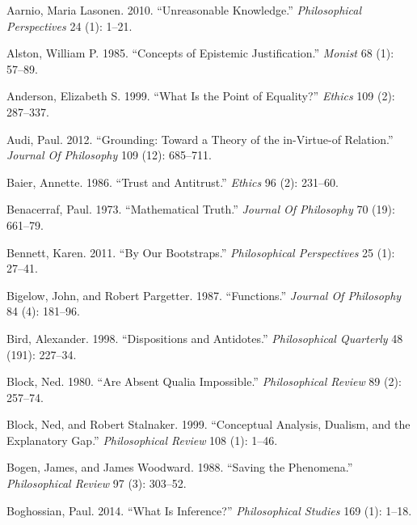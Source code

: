 \documentclass[
  10pt,
  letterpaper,
  DIV=11,
  numbers=noendperiod,
  twoside]{scrartcl}
\newlength{\cslhangindent}
\newenvironment{CSLReferences}[2] %
 {\begin{list}{}{%
  \setlength{\itemindent}{0pt}
  \setlength{\leftmargin}{0pt}
  \setlength{\parsep}{0pt}
  \ifodd #1
   \setlength{\leftmargin}{\cslhangindent}
   \setlength{\itemindent}{-1\cslhangindent}
  \fi
  \setlength{\itemsep}{#2\baselineskip}}}
 {\end{list}}
\begin{document}
\label{refs}
\begin{CSLReferences}{1}{0}
Aarnio, Maria Lasonen. 2010. {``Unreasonable Knowledge.''}
\emph{Philosophical Perspectives} 24 (1): 1--21.

Alston, William P. 1985. {``Concepts of Epistemic Justification.''}
\emph{Monist} 68 (1): 57--89.

Anderson, Elizabeth S. 1999. {``What Is the Point of Equality?''}
\emph{Ethics} 109 (2): 287--337.

Audi, Paul. 2012. {``Grounding: Toward a Theory of the in-Virtue-of
Relation.''} \emph{Journal Of Philosophy} 109 (12): 685--711.

Baier, Annette. 1986. {``Trust and Antitrust.''} \emph{Ethics} 96 (2):
231--60.

Benacerraf, Paul. 1973. {``Mathematical Truth.''} \emph{Journal Of
Philosophy} 70 (19): 661--79.

Bennett, Karen. 2011. {``By Our Bootstraps.''} \emph{Philosophical
Perspectives} 25 (1): 27--41.

Bigelow, John, and Robert Pargetter. 1987. {``Functions.''}
\emph{Journal Of Philosophy} 84 (4): 181--96.

Bird, Alexander. 1998. {``Dispositions and Antidotes.''}
\emph{Philosophical Quarterly} 48 (191): 227--34.

Block, Ned. 1980. {``Are Absent Qualia Impossible.''}
\emph{Philosophical Review} 89 (2): 257--74.

Block, Ned, and Robert Stalnaker. 1999. {``Conceptual Analysis, Dualism,
and the Explanatory Gap.''} \emph{Philosophical Review} 108 (1): 1--46.

Bogen, James, and James Woodward. 1988. {``Saving the Phenomena.''}
\emph{Philosophical Review} 97 (3): 303--52.

Boghossian, Paul. 2014. {``What Is Inference?''} \emph{Philosophical
Studies} 169 (1): 1--18.


\end{CSLReferences}
\end{document}

